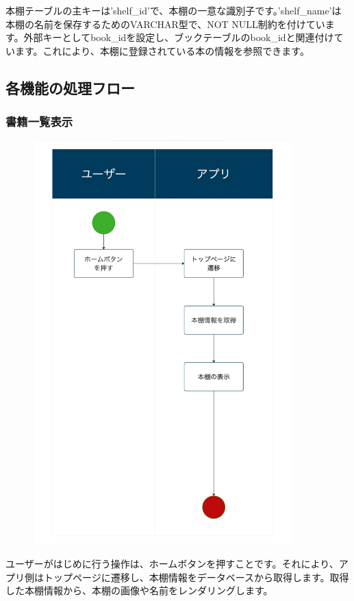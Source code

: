 \documentclass[a4paper, 11pt, titlepage]{jsarticle}
\begin{document}
本棚テーブルの主キーは'shelf\_id'で、本棚の一意な識別子です。'shelf\_name'は本棚の名前を保存するためのVARCHAR型で、NOT NULL制約を付けています。外部キーとしてbook\_idを設定し、ブックテーブルのbook\_idと関連付けています。これにより、本棚に登録されている本の情報を参照できます。

\clearpage
\subsection{各機能の処理フロー}
\subsubsection{書籍一覧表示}
\begin{figure}[h]
  \centering
  \includegraphics[width=100mm]{flow-ichiran.jpg}
  \label{fig:func}
\end{figure}
ユーザーがはじめに行う操作は、ホームボタンを押すことです。それにより、アプリ側はトップページに遷移し、本棚情報をデータベースから取得します。取得した本棚情報から、本棚の画像や名前をレンダリングします。

\clearpage
\end{document}
